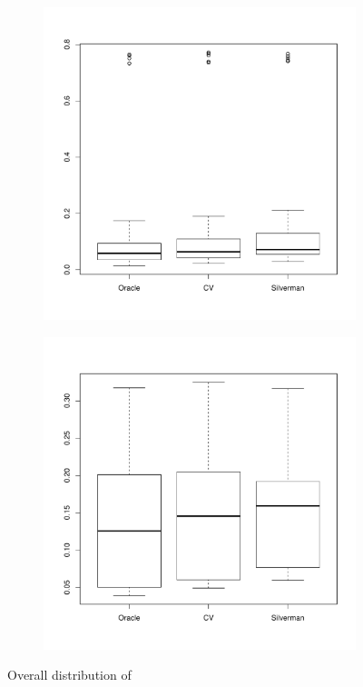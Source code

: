 \begin{figure}[htbp]
    \centering
    \begin{subfigure}[t]{0.45\textwidth}
        \includegraphics[width=\textwidth]{results/by_overall/relative-peak-drift-boxplot}
        \label{fig:discussion:overall_peakdrift_boxplot:unif}
    \end{subfigure}
    \begin{subfigure}[t]{0.45\textwidth}
        \includegraphics[width=\textwidth]{results/by_overall/relative-peak-drift-peakpop-boxplot}
        \label{fig:discussion:overall_peakdrift_boxplot:peak}
    \end{subfigure}
    \caption{Overall distribution of }
    \label{fig:discussion:overall_peakdrift_boxplot}
\end{figure}

